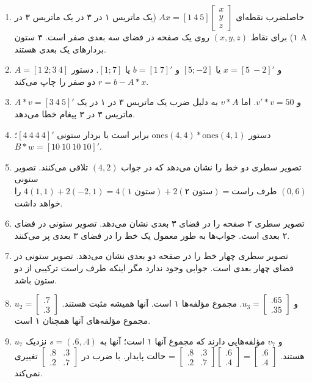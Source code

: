 \documentclass[12pt]{article}
\begin{document}
\begin{enumerate}
		\item حاصلضرب نقطه‌ای $Ax=[1 \ 4 \ 5] \begin{bmatrix} x \\ y \\ z \end{bmatrix}$ (یک ماتریس ۱ در ۳ در یک ماتریس ۳ در ۱) برای نقاط $(x,y,z)$ روی یک صفحه در فضای سه بعدی صفر است. ۳ ستون A بردارهای یک بعدی هستند.
		
		\item $A=[1 \ 2 ; 3 \ 4]$ و $x=[5 \ -2]'$ یا $[5 ; -2]$ و $b=[1 \ 7]'$ یا $[1 ; 7]$. دستور $r=b-A*x$ دو صفر را چاپ می‌کند.
		
		\item $A*v=[3 \ 4 \ 5]'$ و $v'*v=50$. اما $v*A$ به دلیل ضرب یک ماتریس ۳ در ۱ در یک ماتریس ۳ در ۳ پیغام خطا می‌دهد.
		
		\item دستور $\text{ones}(4,4)*\text{ones}(4,1)$ برابر است با بردار ستونی $[4 \ 4 \ 4 \ 4]'$؛ $B*w=[10 \ 10 \ 10 \ 10]'$.
		
		\item تصویر سطری دو خط را نشان می‌دهد که در جواب $(4,2)$ تلاقی می‌کنند. تصویر ستونی $4(1,1)+2(-2,1)=4(\text{ستون ۱})+2(\text{ستون ۲}) = \text{طرف راست } (0,6)$ را خواهد داشت.
		
		\item تصویر سطری ۲ صفحه را در فضای ۳ بعدی نشان می‌دهد. تصویر ستونی در فضای ۲ بعدی است. جواب‌ها به طور معمول یک خط را در فضای ۳ بعدی پر می‌کنند.
		
		\item تصویر سطری چهار خط را در صفحه دو بعدی نشان می‌دهد. تصویر ستونی در فضای چهار بعدی است. جوابی وجود ندارد مگر اینکه طرف راست ترکیبی از دو ستون باشد.
		
		\item $u_2= \begin{bmatrix} .7 \\ .3 \end{bmatrix}$ و $u_3= \begin{bmatrix} .65 \\ .35 \end{bmatrix}$. مجموع مؤلفه‌ها ۱ است. آنها همیشه مثبت هستند. مجموع مؤلفه‌های آنها همچنان ۱ است.
		
		\item $u_7$ و $v_7$ مؤلفه‌هایی دارند که مجموع آنها ۱ است؛ آنها به $s=(.6,.4)$ نزدیک هستند.
		$\begin{bmatrix} .8 & .3 \\ .2 & .7 \end{bmatrix} \begin{bmatrix} .6 \\ .4 \end{bmatrix} = \begin{bmatrix} .6 \\ .4 \end{bmatrix}$ = حالت پایدار. با ضرب در $\begin{bmatrix} .8 & .3 \\ .2 & .7 \end{bmatrix}$ تغییری نمی‌کند.
		

\end{enumerate}
\end{document}
